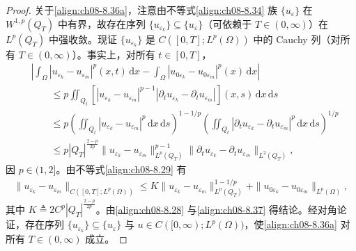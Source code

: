 \documentclass[../../main.tex]{subfiles}%
\begin{document}
\begin{proof}
关于\eqref{align:ch08-8.36a}，注意由不等式\eqref{align:ch08-8.34} 族 $\{u_\varepsilon\}$ 在 $W^{1,p}(Q_T)$ 中有界，故存在序列 $\{u_{\varepsilon_k}\}\subseteq\{u_\varepsilon\}$（可依赖于 $T\in(0,\infty)$）在 $L^p(Q_T)$ 中强收敛。现证 $\{u_{\varepsilon_k}\}$ 是 $C([0,T];L^p(\Omega))$ 中的 Cauchy 列（对所有 $T\in(0,\infty)$）。事实上，对所有 $t\in[0,T]$，
\begin{align*}
&\left|\int_\Omega|u_{\varepsilon_k}-u_{\varepsilon_m}|^p(x,t)\,\mathrm{d}x-\int_\Omega|u_{0\varepsilon_k}-u_{0\varepsilon_m}|^p(x)\,\mathrm{d}x\right|\\
&\qquad\leqslant p\iint_{Q_t}[|u_{\varepsilon_k}-u_{\varepsilon_m}|^{p-1}|\partial_t u_{\varepsilon_k}-\partial_t u_{\varepsilon_m}|](x,s)\,\mathrm{d}x\,\mathrm{d}s\\
&\qquad\leqslant p\left(\iint_{Q_t}|u_{\varepsilon_k}-u_{\varepsilon_m}|^p\,\mathrm{d}x\,\mathrm{d}s\right)^{1-1/p}
\left(\iint_{Q_t}|\partial_t u_{\varepsilon_k}-\partial_t u_{\varepsilon_m}|^p\,\mathrm{d}x\,\mathrm{d}s\right)^{1/p}\\
&\qquad\leqslant p|Q_T|^{\frac{2-p}{2p}}
\|u_{\varepsilon_k}-u_{\varepsilon_m}\|^{p-1}_{L^p(Q_T)}
\|\partial_t u_{\varepsilon_k}-\partial_t u_{\varepsilon_m}\|_{L^2(Q_T)},
\end{align*}
因 $p\in(1,2]$。由不等式\eqref{align:ch08-8.29} 有
\begin{align}
\|u_{\varepsilon_k}-u_{\varepsilon_m}\|_{C([0,T];L^p(\Omega))}
\leqslant K\|u_{\varepsilon_k}-u_{\varepsilon_m}\|^{1-1/p}_{L^p(Q_T)}
+\|u_{0\varepsilon_k}-u_{0\varepsilon_m}\|_{L^p(\Omega)}, \label{align:ch08-8.37}
\end{align}
其中 $K\triangleq 2C^p|Q_T|^{\frac{2-p}{2p}}$。由\eqref{align:ch08-8.28} 与\eqref{align:ch08-8.37} 得结论。经对角论证，存在序列 $\{u_{\varepsilon_k}\}\subseteq\{u_\varepsilon\}$ 与 $u\in C([0,\infty);L^p(\Omega))$，使\eqref{align:ch08-8.36a} 对所有 $T\in(0,\infty)$ 成立。


\end{proof}
\end{document}
